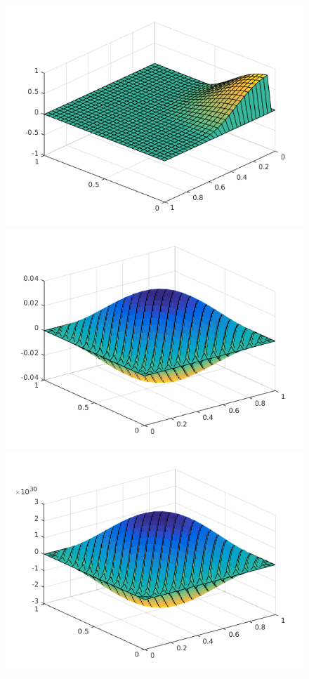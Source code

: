 \begin{figure}
\includegraphics[scale = 0.33]{images/transport.png}
\includegraphics[scale = 0.33]{images/heatUnstable.png}
\includegraphics[scale = 0.33]{images/waveUnstable.png}

\end{figure}
